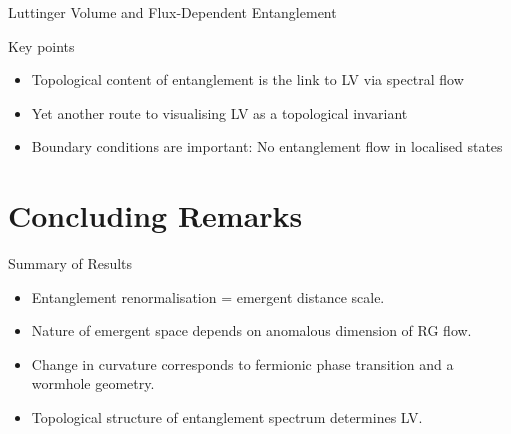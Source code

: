 \documentclass[12pt,aspectratio=169]{beamer}
\begin{document}
\begin{frame}{Luttinger Volume and Flux-Dependent Entanglement}
{	\flushleft
	\alert{Key points}
	\begin{itemize}
		\item Topological content of entanglement is the link to LV via spectral flow
		\item Yet another route to visualising LV as a topological invariant
		\item \alert{Boundary conditions} are important: No entanglement flow in localised states
	\end{itemize}
}
\end{frame}

\section{Concluding Remarks}
\begin{frame}{Summary of Results}
	\begin{itemize}
		\item Entanglement renormalisation = emergent distance scale. \\[10pt]
		\item Nature of emergent space depends on anomalous dimension of RG flow.\\[10pt]
		\item Change in curvature corresponds to fermionic phase transition and a wormhole geometry.\\[10pt]
		\item Topological structure of entanglement spectrum determines LV.\\[10pt]
	\end{itemize}
\end{frame}
\end{document}
